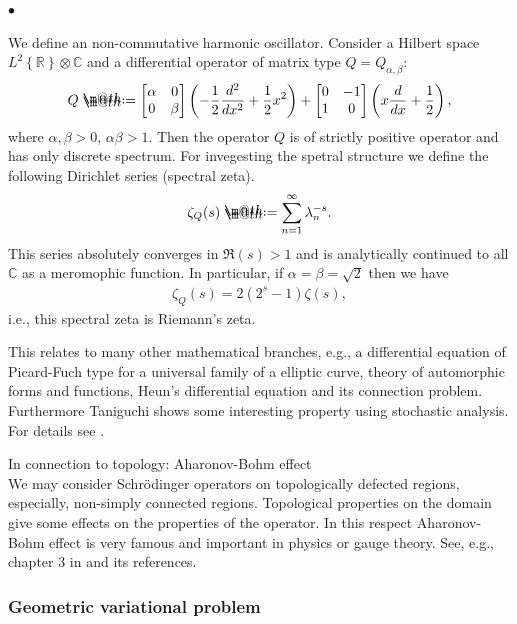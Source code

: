 \documentclass[openany, a4paper, oneside]{book}
\makeatletter
\newcounter{enum2}
\renewenvironment{itemize}{%
\begin{list}{$\bullet$\ \ }%
{%
\usecounter{enum2}
\setlength{\itemindent}{0pt}%
\setlength{\leftmargin}{6pt}%
\setlength{\rightmargin}{0pt}%
\setlength{\labelsep}{0pt}%
\setlength{\labelwidth}{6pt}%
\setlength{\itemsep}{0pt}%
\setlength{\parsep}{0pt}%
\setlength{\listparindent}{0pt}%
}
}{%
\end{list}%
}
\newcommand*{\defeq}{\mathrel{\rlap{%
\raisebox{0.3ex}{$\m@th\cdot$}}%
\raisebox{-0.3ex}{$\m@th\cdot$}}%
=}
\theoremstyle{break}
\theoremstyle{breakdefn}
\newcommand{\rbk}[1]{\left (#1\right)}
\newcommand{\cbk}[1]{\left\{#1\right\}}
\newcommand{\bbC}{\mathbb{C}}
\newcommand{\bbR}{\mathbb{R}}
\makeatother
\begin{document}
\begin{itemize}
We define an non-commutative harmonic oscillator.
Consider a Hilbert space $L^2 \cbk{\bbR} \otimes \bbC$ and
a differential operator of matrix type $Q = Q_{\alpha, \beta}$:
\begin{align}
 Q
 \defeq
 \begin{bmatrix}
  \alpha & 0 \\
  0      & \beta
 \end{bmatrix}
 \rbk{- \frac{1}{2} \frac{d^2}{dx^2} + \frac{1}{2} x^2} +
 \begin{bmatrix}
  0 & -1 \\
  1 & 0
 \end{bmatrix}
 \rbk{x \frac{d}{dx} + \frac{1}{2}},
\end{align}
where $\alpha, \beta > 0$, $\alpha \beta > 1$.
Then the operator $Q$ is of strictly positive operator and has only discrete spectrum.
For invegesting the spetral structure we define the following Dirichlet series (spectral zeta).
\begin{align}
 \zeta_{Q} (s)
 \defeq
 \sum_{n=1}^{\infty} \lambda_{n}^{-s}.
\end{align}
This series absolutely converges in $\Re \rbk{s} > 1$ and
is analytically continued to all $\bbC$ as a meromophic function.
In particular, if $\alpha = \beta = \sqrt{2}$ then we have
\begin{align}
 \zeta_{Q} (s)
 =
 2 \rbk{2^s - 1} \zeta (s),
\end{align}
i.e., this spectral zeta is Riemann's zeta.

This relates to many other mathematical branches, e.g.,
a differential equation of Picard-Fuch type  for a universal family of a elliptic curve,
theory of automorphic forms and functions,
Heun's differential equation and its connection problem.
Furthermore Taniguchi shows some interesting property using stochastic analysis.
For details see \cite{AlbertoParmeggiani1}.

\item In connection to topology: Aharonov-Bohm effect\\
\label{sec-7-10-1-4-1-7}%
We may consider Schr\"odinger operators on topologically defected regions,
especially, non-simply connected regions.
Topological properties on the domain give some effects on the properties of the operator.
In this respect Aharonov-Bohm effect is very famous and important in physics or gauge theory.
See, e.g., chapter 3 in \cite{AsaoArai4} and its references.
\end{itemize} %
\subsubsection{Geometric variational problem}
\label{sec-7-10-1-4-2}
\end{document}
